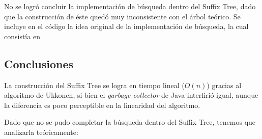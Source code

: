 \documentclass[letterpaper,10pt]{article}
\begin{document}
	No se logró concluir la implementación de búsqueda dentro del Suffix Tree, dado que la construcción de éste quedó muy inconsistente con el árbol teórico. Se incluye en el código la
	idea original de la implementación de búsqueda, la cual consistía en %

	\subsection{Conclusiones}

	La construcción del Suffix Tree se logra en tiempo lineal ($O(n)$) gracias al algoritmo de Ukkonen, si bien el \textit{garbage collector} de Java interfirió igual, aunque la diferencia
	es poco perceptible en la linearidad del algoritmo.

	Dado que no se pudo completar la búsqueda dentro del Suffix Tree, tenemos que analizarla teóricamente: %
\end{document}
